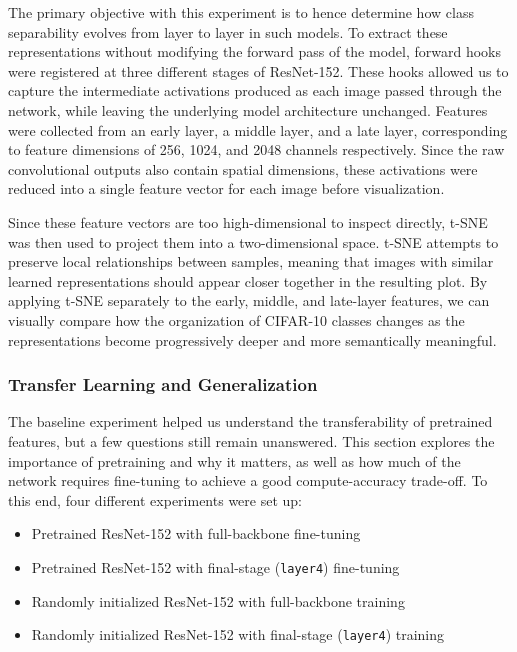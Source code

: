 \documentclass{article}
\begin{document}
The primary objective with this experiment is to hence determine how class separability evolves from layer to layer in such models.  To extract these representations without modifying the forward pass of the model, forward hooks were registered at three different stages of ResNet-152. These hooks allowed us to capture the intermediate activations produced as each image passed through the network, while leaving the underlying model architecture unchanged. Features were collected from an early layer, a middle layer, and a late layer, corresponding to feature dimensions of 256, 1024, and 2048 channels respectively. Since the raw convolutional outputs also contain spatial dimensions, these activations were reduced into a single feature vector for each image before visualization.

Since these feature vectors are too high-dimensional to inspect directly, t-SNE was then used to project them into a two-dimensional space. t-SNE attempts to preserve local relationships between samples, meaning that images with similar learned representations should appear closer together in the resulting plot. By applying t-SNE separately to the early, middle, and late-layer features, we can visually compare how the organization of CIFAR-10 classes changes as the representations become progressively deeper and more semantically meaningful.

\subsubsection{Transfer Learning and Generalization}
The baseline experiment helped us understand the transferability of pretrained features, but a few questions still remain unanswered. This section explores the importance of pretraining and why it matters, as well as how much of the network requires fine-tuning to achieve a good compute-accuracy trade-off.
To this end, four different experiments were set up:

\begin{itemize}
    \item Pretrained ResNet-152 with full-backbone fine-tuning
    \item Pretrained ResNet-152 with final-stage (\texttt{layer4}) fine-tuning
    \item Randomly initialized ResNet-152 with full-backbone training
    \item Randomly initialized ResNet-152 with final-stage (\texttt{layer4}) training
\end{itemize}
\end{document}
